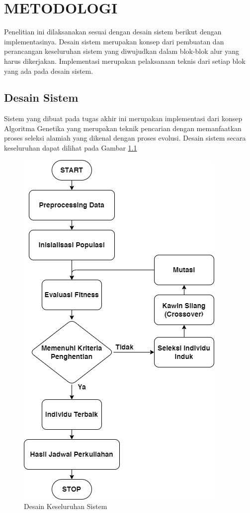 \chapter{METODOLOGI}
\label{chap:metodologi}


Penelitian ini dilaksanakan sesuai dengan desain sistem berikut dengan implementasinya.
Desain sistem merupakan konsep dari pembuatan dan perancangan keseluruhan sistem yang diwujudkan dalam blok-blok alur yang harus dikerjakan. 
Implementasi merupakan pelaksanaan teknis dari setiap blok yang ada pada desain sistem.

\section{Desain Sistem}
\label{sec:Desain Sistem}
Sistem yang dibuat pada tugas akhir ini merupakan implementasi dari konsep Algoritma Genetika yang merupakan teknik pencarian dengan memanfaatkan proses seleksi alamiah yang dikenal dengan proses evolusi.
Desain sistem secara keseluruhan dapat dilihat pada Gambar \ref{fig:metodologi}
\begin{figure} [ht] \centering
  \includegraphics[scale=0.55]{gambar/desain.png}
  \caption{Desain Keseluruhan Sistem}
  \label{fig:metodologi}
\end{figure}

